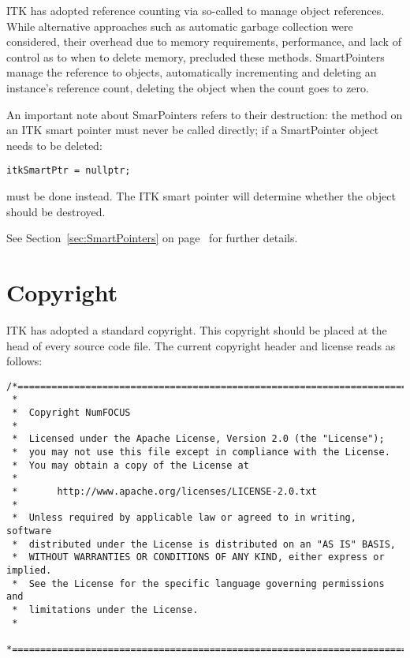 ITK has adopted reference counting via so-called  to
manage object references. While alternative approaches such as automatic garbage
collection were considered, their overhead due to memory requirements,
performance, and lack of control as to when to delete memory, precluded these
methods. SmartPointers manage the reference to objects, automatically
incrementing and deleting an instance's reference count, deleting the object
when the count goes to zero.

An important note about SmarPointers refers to their destruction: the
 method on an ITK smart pointer must never be called directly; if
a SmartPointer object  needs to be deleted:
\small
\begin{verbatim}
itkSmartPtr = nullptr;
\end{verbatim}
\normalsize

must be done instead. The ITK smart pointer will determine whether the object
should be destroyed.

See Section~\ref{sec:SmartPointers} on page~\pageref{sec:SmartPointers} for
further details.


\section{Copyright}
\label{sec:Copyright}

ITK has adopted a standard copyright. This copyright should be placed at the
head of every source code file. The current copyright header and license reads
as follows:

\small
\begin{verbatim}
/*=========================================================================
 *
 *  Copyright NumFOCUS
 *
 *  Licensed under the Apache License, Version 2.0 (the "License");
 *  you may not use this file except in compliance with the License.
 *  You may obtain a copy of the License at
 *
 *       http://www.apache.org/licenses/LICENSE-2.0.txt
 *
 *  Unless required by applicable law or agreed to in writing, software
 *  distributed under the License is distributed on an "AS IS" BASIS,
 *  WITHOUT WARRANTIES OR CONDITIONS OF ANY KIND, either express or implied.
 *  See the License for the specific language governing permissions and
 *  limitations under the License.
 *
 *=========================================================================*/
\end{verbatim}
\normalsize

